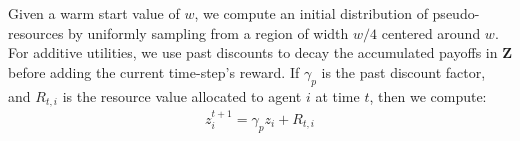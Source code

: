 \begin{table}[]
\caption{Warm start ($w$) and past discount ($\gamma_p$) values for different environments and fairness functions used for DECAF.}
\label{tab:warm-past-disc}
\begin{minipage}{\linewidth}
\centering
{}
\end{minipage}
\end{table}




Given a warm start value of $w$, we compute an initial distribution of pseudo-resources by uniformly sampling from a region of width $w/4$ centered around $w$. For additive utilities, we use past discounts to decay the accumulated payoffs in $\textbf{Z}$ before adding the current time-step's reward. If $\gamma_p$ is the past discount factor, and $R_{t,i}$ is the resource value allocated to agent $i$ at time $t$, then we compute:
\begin{align*}
    z_i^{t+1} = \gamma_p z_i + R_{t,i}
\end{align*}

